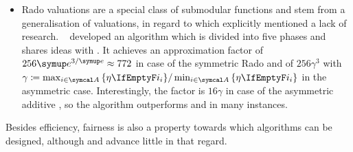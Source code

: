 \begin{itemize}
	\item
	Rado valuations are a special class of submodular functions and stem from a generalisation of \OXS{} valuations, in regard to which \citeauthor{APNSWuSVþUM} explicitly mentioned a lack of research.
	~\cite{approximating_nsw_under_rado_valuations} developed an algorithm which is divided into five phases and shares ideas with \RepReMatch.
	It achieves an approximation factor of \(256 \euler^{3/\euler} \approx 772\) in case of the symmetric Rado \NSW{} and of \(256 \gamma^3\) with \(\gamma \coloneq \max_{i \in \agents} \,\braces{\weight} / \min_{i \in \agents} \,\braces{\weight}\) in the asymmetric case.
	Interestingly, the factor is \(16 \gamma\) in case of the asymmetric additive \NSW, so the algorithm outperforms \SMatch{} and \RepReMatch{} in many instances.
\end{itemize}
Besides efficiency, fairness is also a property towards which algorithms can be designed, although \SMatch{} and \RepReMatch{} advance little in that regard.
%
%
